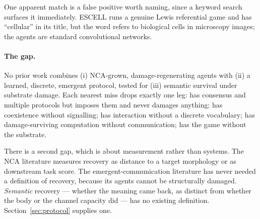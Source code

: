 One apparent match is a false positive worth naming, since a keyword search
surfaces it immediately. ESCELL \citep{chowdhury2020escell} runs a genuine Lewis
referential game and has ``cellular'' in its title, but the word refers to
biological cells in microscopy images; the agents are standard convolutional
networks.

\paragraph{The gap.}
No prior work combines (i) NCA-grown, damage-regenerating agents with (ii) a
learned, discrete, emergent protocol, tested for (iii) semantic survival under
substrate damage. Each nearest miss drops exactly one leg: \citet{singh2026communication}
has consensus and multiple protocols but imposes them and never damages anything;
\citet{stovold2025identity} has coexistence without signalling;
\citet{sakana2026pdnca} has interaction without a discrete vocabulary;
\citet{variengien2021towards} has damage-surviving computation without
communication; \citet{chowdhury2020escell} has the game without the substrate.

There is a second gap, which is about measurement rather than systems. The NCA
literature measures recovery as distance to a target morphology or as downstream
task score. The emergent-communication literature has never needed a definition
of recovery, because its agents cannot be structurally damaged. \emph{Semantic}
recovery --- whether the meaning came back, as distinct from whether the body or
the channel capacity did --- has no existing definition. Section~\ref{sec:protocol}
supplies one.
